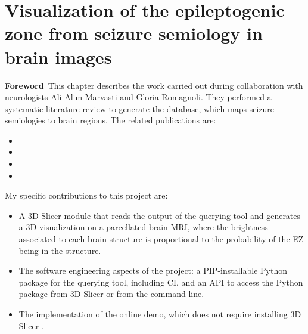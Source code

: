 \chapter[Visualization of the epileptogenic zone in brain images]{Visualization of the epileptogenic zone from seizure semiology in brain images}

\label{chap:svt}
\minitoc

\begin{center}
  \begin{minipage}[b]{0.9\linewidth}
    \small
    \textbf{Foreword\,}
    This chapter describes the work carried out during collaboration with neurologists Ali Alim-Marvasti and Gloria Romagnoli.
    They performed a systematic literature review to generate the \svtdatabase database, which maps seizure semiologies to brain regions.
    The related publications are:
    \begin{itemize}
      \item {}
      \item {}
      \item {}
      \item {}
    \end{itemize}

    My specific contributions to this project are:
    \begin{itemize}
      \item A 3D Slicer module \cite{fedorov_3d_2012} that reads the output of the querying tool and generates a 3D visualization on a parcellated brain \ac{MRI}, where the brightness associated to each brain structure is proportional to the probability of the \ac{EZ} being in the structure.
      \item The software engineering aspects of the project: a \ac{PIP}-installable Python package for the querying tool, including \ac{CI}, and an \ac{API} to access the Python package from 3D Slicer or from the command line.
      \item The implementation of the online demo, which does not require installing 3D Slicer%
      .
    \end{itemize}

  \end{minipage}
\end{center}

\acresetall
\bodyspacing





\onehalfspacing %
